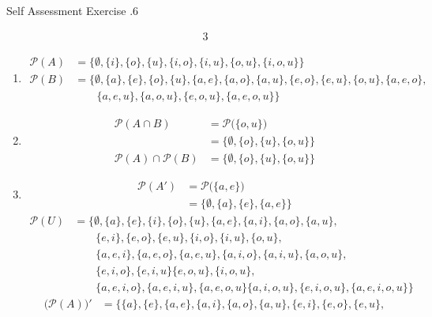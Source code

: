 \documentclass[../notes.tex]{subfiles}
\begin{document}
\begin{exercise}{Self Assessment Exercise \thechapter.6}
\begin{enumerate}
\begin{alignat*}{3}
						\end{alignat*}
						\begin{enumerate}[label=(\alph*)]
							\item \moveup
								\begin{align*}
									\mathcal{P}(A) &= \bigl\{\emptyset, \{i\}, \{o\}, \{u\}, \{i, o\}, \{i, u\}, \{o, u\}, \{i, o, u\}\bigr\}\\
									\mathcal{P}(B) &= \bigl\{\emptyset, \{a\}, \{e\}, \{o\}, \{u\}, \{a, e\}, \{a, o\}, \{a, u\}, \{e, o\}, \{e, u\}, \{o, u\}, \{a, e, o\},\\
									& \qquad \{a, e, u\}, \{a, o, u\}, \{e, o, u\}, \{a, e, o, u\}\bigr\}
								\end{align*}
							\item \moveup
								\begin{align*}
									\mathcal{P}(A \cap B) &= \mathcal{P}\bigl(\{o, u\}\bigr)\\
									&= \bigl\{\emptyset, \{o\}, \{u\}, \{o, u\}\bigr\}\\
									\mathcal{P}(A) \cap \mathcal{P}(B) &= \bigl\{\emptyset, \{o\}, \{u\}, \{o, u\}\bigr\}
								\end{align*}
							\item \moveup
								\begin{align*}
									\mathcal{P}\left(A'\right) &= \mathcal{P}\bigl(\{a, e\}\bigr)\\
									&= \bigl\{\emptyset, \{a\}, \{e\}, \{a, e\}\bigr\}
								\end{align*}
								\begin{align*}
									\mathcal{P}(U) &= \bigl\{\emptyset, \{a\}, \{e\}, \{i\}, \{o\}, \{u\}, \{a, e\}, \{a, i\}, \{a, o\}, \{a, u\},\\
									& \qquad \{e, i\}, \{e, o\}, \{e, u\}, \{i, o\}, \{i, u\}, \{o, u\},\\
									& \qquad \{a, e, i\}, \{a, e, o\}, \{a, e, u\}, \{a, i, o\}, \{a, i, u\}, \{a, o, u\},\\
									& \qquad \{e, i, o\}, \{e, i, u\} \{e, o, u\}, \{i, o, u\},\\
									& \qquad \{a, e, i, o\}, \{a, e, i, u\}, \{a, e, o, u\} \{a, i, o, u\}, \{e, i, o, u\}, \{a, e, i, o, u\}\bigr\}
								\end{align*}
								\begin{align*}
									\bigl(\mathcal{P}(A)\bigr)' &= \bigl\{\{a\}, \{e\}, \{a, e\}, \{a, i\}, \{a, o\}, \{a, u\}, \{e, i\}, \{e, o\}, \{e, u\},\\

\end{align*}
\end{enumerate}
\end{enumerate}
\end{exercise}
\end{document}
